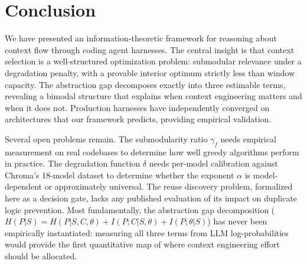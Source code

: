 \documentclass[11pt, a4paper, logo, copyright]{googledeepmind}
\begin{document}
\section{Conclusion}
\label{sec:conclusion}

We have presented an information-theoretic framework for reasoning about context flow through coding agent harnesses. The central insight is that context selection is a well-structured optimization problem: submodular relevance under a degradation penalty, with a provable interior optimum strictly less than window capacity. The abstraction gap decomposes exactly into three estimable terms, revealing a bimodal structure that explains when context engineering matters and when it does not. Production harnesses have independently converged on architectures that our framework predicts, providing empirical validation.

Several open problems remain. The submodularity ratio $\gamma_f$ needs empirical measurement on real codebases to determine how well greedy algorithms perform in practice. The degradation function $\delta$ needs per-model calibration against Chroma's 18-model dataset to determine whether the exponent $\alpha$ is model-dependent or approximately universal. The reuse discovery problem, formalized here as a decision gate, lacks any published evaluation of its impact on duplicate logic prevention. Most fundamentally, the abstraction gap decomposition ($H(P|S) = H(P|S,C,\theta) + I(P;C|S,\theta) + I(P;\theta|S)$) has never been empirically instantiated: measuring all three terms from LLM log-probabilities would provide the first quantitative map of where context engineering effort should be allocated.



\end{document}
